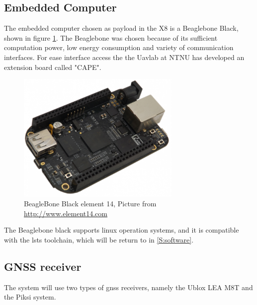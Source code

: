 \subsection{Embedded Computer}
The embedded computer chosen as payload in the X8 is a Beaglebone Black, shown in figure \ref{figure:BeagleBone}. The Beaglebone was chosen because of its sufficient computation power, low energy consumption and variety of communication interfaces. For ease interface access the  the Uavlab at NTNU has developed an extension board called "CAPE".
\begin{figure}[H]
	\centering
		\includegraphics[width=0.7\textwidth]{figs/BeagleBoneBlackE14.png}
		\caption{BeagleBone Black element 14, Picture from \url{http://www.element14.com}}
		\label{figure:BeagleBone}
\end{figure}
The Beaglebone black supports linux operation systems, and it is compatible with the \gls{lsts} toolchain, which will be return to in \ref{S:software}.
\subsection{GNSS receiver}
The system will use two types of \gls{gnss} receivers, namely the Ublox LEA M8T and the Piksi system. 

